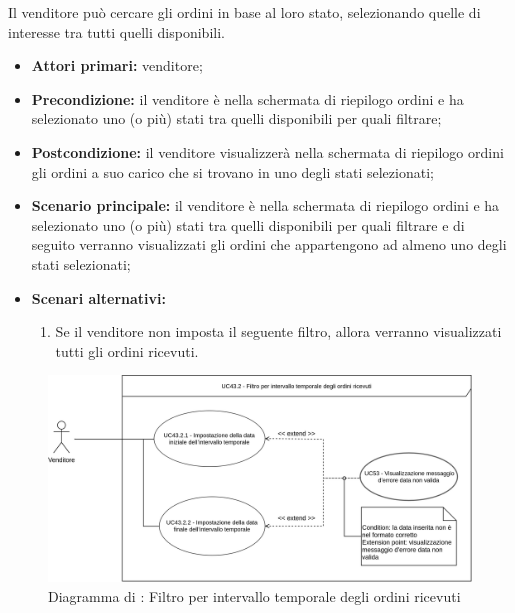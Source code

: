 Il venditore può cercare gli ordini in base al loro stato, selezionando quelle di interesse tra tutti quelli disponibili.
\begin{itemize}
	\item \textbf{Attori primari:} venditore;
	\item \textbf{Precondizione:} il venditore è nella schermata di riepilogo ordini e ha selezionato uno (o più) stati tra quelli disponibili per quali filtrare;
	\item \textbf{Postcondizione:} il venditore visualizzerà nella schermata di riepilogo ordini gli ordini a suo carico che si trovano in uno degli stati selezionati;
	\item \textbf{Scenario principale:} il venditore è nella schermata di riepilogo ordini e ha selezionato uno (o più) stati tra quelli disponibili per quali filtrare e di seguito verranno visualizzati gli ordini che appartengono ad almeno uno degli stati selezionati;
	\item \textbf{Scenari alternativi:}
	\begin{enumerate}[label=\lett]
		\item Se il venditore non imposta il seguente filtro, allora verranno visualizzati tutti gli ordini ricevuti.
	\end{enumerate}
\end{itemize}

\label{filtro-ordini-venditore.temporale}

\begin{figure}[H]
    \centering
    \includegraphics[width=\textwidth]{Immagini/DiagrammiUC/Venditore/FiltroIntervalloTemporaleVenditore.png}
    \caption{Diagramma di \actualSubUC: Filtro per intervallo temporale degli ordini ricevuti}
    \label{fig:filtro-ordini-venditore.temporale}
\end{figure}

